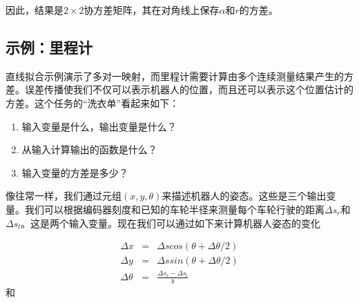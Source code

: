 因此，结果是$2\times 2$协方差矩阵，其在对角线上保存$\alpha$和$r$的方差。

\subsection{示例：里程计}


直线拟合示例演示了多对一映射，而里程计需要计算由多个连续测量结果产生的方差。误差传播使我们不仅可以表示机器人的位置，而且还可以表示这个位置估计的方差。这个任务的“洗衣单”看起来如下：

\begin{enumerate}

\item 输入变量是什么，输出变量是什么？
\item 从输入计算输出的函数是什么？
\item 输入变量的方差是多少？
\end{enumerate}


像往常一样，我们通过元组$(x,y,\theta)$来描述机器人的姿态。这些是三个输出变量。我们可以根据编码器刻度和已知的车轮半径来测量每个车轮行驶的距离$\Delta s_r$和$\Delta s_l$。这是两个输入变量。现在我们可以通过如下来计算机器人姿态的变化

\begin{eqnarray}
\Delta x  &=& \Delta s cos(\theta+\Delta \theta /2)\\
\Delta y  &=& \Delta s sin(\theta+\Delta \theta/2)\\
\Delta \theta &=& \frac{\Delta s_r-\Delta s_l}{b}
\end{eqnarray}
和

